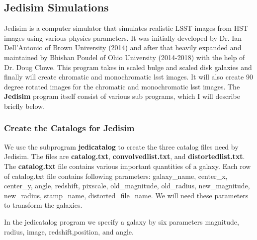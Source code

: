 \subsection{Jedisim Simulations}
Jedisim is a computer simulator that simulates realistic LSST images from HST images using various physics parameters.
It was initially developed by Dr. Ian Dell'Antonio of Brown University (2014) and after that heavily expanded and maintained by Bhishan Poudel of Ohio University (2014-2018) with the help of Dr. Doug Clowe. 
This program takes in scaled bulge and scaled disk galaxies and finally will create chromatic and monochromatic lsst images. It will also create 90 degree rotated images for the chromatic and monochromatic lsst images.
The \textbf{Jedisim} program itself consist of various sub programs, which I will describe briefly below.

\subsubsection{Create the Catalogs for Jedisim}
We use the subprogram \textbf{jedicatalog} to create the three catalog files need by Jedisim. The files are \textbf{catalog.txt}, \textbf{convolvedlist.txt}, and \textbf{distortedlist.txt}. The \textbf{catalog.txt} file contains various important quantities of a galaxy. Each row of catalog.txt file contains following parameters: galaxy\_name, center\_x, center\_y, angle, redshift, pixscale, old\_magnitude, old\_radius, new\_magnitude, new\_radius, stamp\_name, distorted\_file\_name. We will need these parameters to transform the galaxies.

In the jedicatalog program we specify a galaxy by six parameters magnitude, radius, image, redshift,position, and angle.

